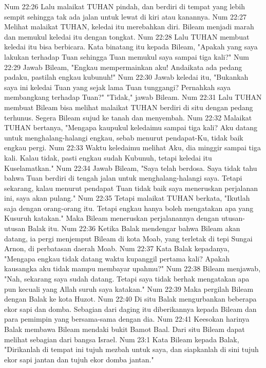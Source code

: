 Num 22:26  Lalu malaikat TUHAN pindah, dan berdiri di tempat yang lebih sempit sehingga tak ada jalan untuk lewat di kiri atau kanannya.
Num 22:27  Melihat malaikat TUHAN, keledai itu merebahkan diri. Bileam menjadi marah dan memukul keledai itu dengan tongkat.
Num 22:28  Lalu TUHAN membuat keledai itu bisa berbicara. Kata binatang itu kepada Bileam, "Apakah yang saya lakukan terhadap Tuan sehingga Tuan memukul saya sampai tiga kali?"
Num 22:29  Jawab Bileam, "Engkau mempermainkan aku! Andaikata ada pedang padaku, pastilah engkau kubunuh!"
Num 22:30  Jawab keledai itu, "Bukankah saya ini keledai Tuan yang sejak lama Tuan tunggangi? Pernahkah saya membangkang terhadap Tuan?" "Tidak," jawab Bileam.
Num 22:31  Lalu TUHAN membuat Bileam bisa melihat malaikat TUHAN berdiri di situ dengan pedang terhunus. Segera Bileam sujud ke tanah dan menyembah.
Num 22:32  Malaikat TUHAN bertanya, "Mengapa kaupukul keledaimu sampai tiga kali? Aku datang untuk menghalang-halangi engkau, sebab menurut pendapat-Ku, tidak baik engkau pergi.
Num 22:33  Waktu keledaimu melihat Aku, dia minggir sampai tiga kali. Kalau tidak, pasti engkau sudah Kubunuh, tetapi keledai itu Kuselamatkan."
Num 22:34  Jawab Bileam, "Saya telah berdosa. Saya tidak tahu bahwa Tuan berdiri di tengah jalan untuk menghalang-halangi saya. Tetapi sekarang, kalau menurut pendapat Tuan tidak baik saya meneruskan perjalanan ini, saya akan pulang."
Num 22:35  Tetapi malaikat TUHAN berkata, "Ikutlah saja dengan orang-orang itu. Tetapi engkau hanya boleh mengatakan apa yang Kusuruh katakan." Maka Bileam meneruskan perjalanannya dengan utusan-utusan Balak itu.
Num 22:36  Ketika Balak mendengar bahwa Bileam akan datang, ia pergi menjemput Bileam di kota Moab, yang terletak di tepi Sungai Arnon, di perbatasan daerah Moab.
Num 22:37  Kata Balak kepadanya, "Mengapa engkau tidak datang waktu kupanggil pertama kali? Apakah kausangka aku tidak mampu membayar upahmu?"
Num 22:38  Bileam menjawab, "Nah, sekarang saya sudah datang. Tetapi saya tidak berhak mengatakan apa pun kecuali yang Allah suruh saya katakan."
Num 22:39  Maka pergilah Bileam dengan Balak ke kota Huzot.
Num 22:40  Di situ Balak mengurbankan beberapa ekor sapi dan domba. Sebagian dari daging itu diberikannya kepada Bileam dan para pemimpin yang bersama-sama dengan dia.
Num 22:41  Keesokan harinya Balak membawa Bileam mendaki bukit Bamot Baal. Dari situ Bileam dapat melihat sebagian dari bangsa Israel.
Num 23:1  Kata Bileam kepada Balak, "Dirikanlah di tempat ini tujuh mezbah untuk saya, dan siapkanlah di sini tujuh ekor sapi jantan dan tujuh ekor domba jantan."
